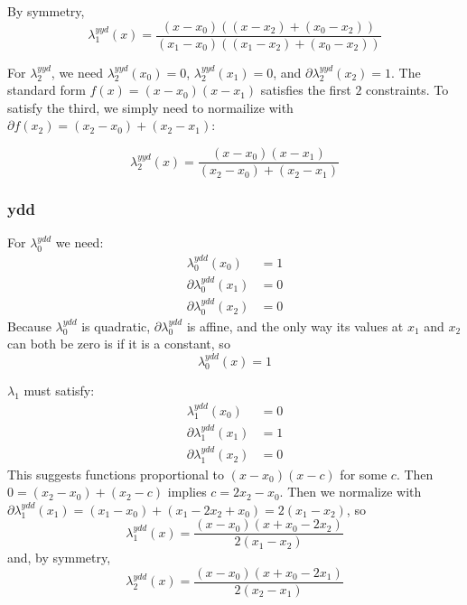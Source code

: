 By symmetry, 
\begin{equation}
\lambda^{yyd}_1(x) = 
\frac 
{(x - x_0) \left( (x - x_2) + (x_0 - x_2) \right)} 
{(x_1 - x_0) \left( (x_1 - x_2) + (x_0 - x_2) \right)}
\end{equation}

 For $\lambda^{yyd}_2$, we need 
$\lambda^{yyd}_2(x_0) = 0$, 
$\lambda^{yyd}_2(x_1) = 0$, and
$\partial\lambda^{yyd}_2(x_2) = 1$. 
The standard form $f(x) = (x-x_0) (x-x_1)$ satisfies the first 
$2$ constraints. 
To satisfy the third, we simply need to normailize with
$\partial{f}(x_2) = (x_2 - x_0) + (x_2 - x_1)$:

\begin{equation}
\lambda^{yyd}_2(x) = 
\frac 
{(x - x_0) (x - x_1)} 
{(x_2 - x_0) + (x_2 - x_1)}
\end{equation}

\subsubsection{ydd}

For $\lambda^{ydd}_0$ we need:
\begin{align}
\lambda^{ydd}_0(x_0) & = 1 \\
\partial\lambda^{ydd}_0(x_1) & = 0 \nonumber \\
\partial\lambda^{ydd}_0(x_2) & = 0 \nonumber
\end{align}
Because $\lambda^{ydd}_0$ is quadratic,
$\partial\lambda^{ydd}_0$ is affine, 
and the only way its values
at $x_1$ and $x_2$ can both be zero is if it is a constant, so 
\begin{equation}
\lambda^{ydd}_0(x) = 1
\end{equation}

$\lambda_1$ must satisfy:
\begin{align}
\lambda^{ydd}_1(x_0) & = 0 \\
\partial\lambda^{ydd}_1(x_1) & = 1 \nonumber \\
\partial\lambda^{ydd}_1(x_2) & = 0 \nonumber
\end{align}
This suggests functions proportional to $(x - x_0) (x - c)$ 
for some $c$. Then 
$ 0 = (x_2 - x_0) + (x_2 - c)$
implies $ c = 2 x_2 - x_0$.
Then we normalize with 
$\partial\lambda^{ydd}_1(x_1) = (x_1 - x_0) + (x_1 - 2 x_2 + x_0) 
= 2 (x_1 - x_2)$, so 
\begin{equation}
\lambda^{ydd}_1(x) = 
\frac {(x - x_0) (x + x_0 - 2 x_2)} {2 (x_1 - x_2)}
\end{equation}
and, by symmetry,
\begin{equation}
\lambda^{ydd}_2(x) = 
\frac {(x - x_0) (x + x_0 - 2 x_1)} {2 (x_2 - x_1)}
\end{equation}

